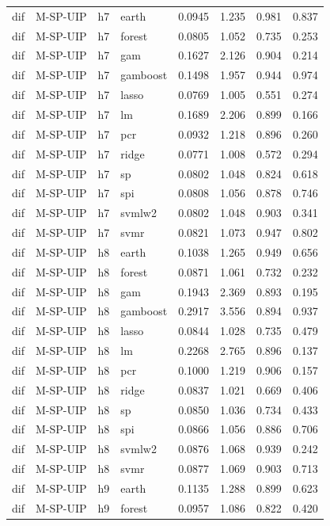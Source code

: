 \begin{ThreePartTable}
\begin{longtable}[t]{llclcccc}
dif & M-SP-UIP & h7 & earth & 0.0945 & 1.235 & 0.981 & 0.837\\
dif & M-SP-UIP & h7 & forest & 0.0805 & 1.052 & 0.735 & 0.253\\
dif & M-SP-UIP & h7 & gam & 0.1627 & 2.126 & 0.904 & 0.214\\
dif & M-SP-UIP & h7 & gamboost & 0.1498 & 1.957 & 0.944 & 0.974\\
dif & M-SP-UIP & h7 & lasso & 0.0769 & 1.005 & 0.551 & 0.274\\
dif & M-SP-UIP & h7 & lm & 0.1689 & 2.206 & 0.899 & 0.166\\
dif & M-SP-UIP & h7 & pcr & 0.0932 & 1.218 & 0.896 & 0.260\\
dif & M-SP-UIP & h7 & ridge & 0.0771 & 1.008 & 0.572 & 0.294\\
dif & M-SP-UIP & h7 & sp & 0.0802 & 1.048 & 0.824 & 0.618\\
dif & M-SP-UIP & h7 & spi & 0.0808 & 1.056 & 0.878 & 0.746\\
dif & M-SP-UIP & h7 & svmlw2 & 0.0802 & 1.048 & 0.903 & 0.341\\
dif & M-SP-UIP & h7 & svmr & 0.0821 & 1.073 & 0.947 & 0.802\\
\addlinespace
dif & M-SP-UIP & h8 & earth & 0.1038 & 1.265 & 0.949 & 0.656\\
dif & M-SP-UIP & h8 & forest & 0.0871 & 1.061 & 0.732 & 0.232\\
dif & M-SP-UIP & h8 & gam & 0.1943 & 2.369 & 0.893 & 0.195\\
dif & M-SP-UIP & h8 & gamboost & 0.2917 & 3.556 & 0.894 & 0.937\\
dif & M-SP-UIP & h8 & lasso & 0.0844 & 1.028 & 0.735 & 0.479\\
dif & M-SP-UIP & h8 & lm & 0.2268 & 2.765 & 0.896 & 0.137\\
dif & M-SP-UIP & h8 & pcr & 0.1000 & 1.219 & 0.906 & 0.157\\
dif & M-SP-UIP & h8 & ridge & 0.0837 & 1.021 & 0.669 & 0.406\\
dif & M-SP-UIP & h8 & sp & 0.0850 & 1.036 & 0.734 & 0.433\\
dif & M-SP-UIP & h8 & spi & 0.0866 & 1.056 & 0.886 & 0.706\\
dif & M-SP-UIP & h8 & svmlw2 & 0.0876 & 1.068 & 0.939 & 0.242\\
dif & M-SP-UIP & h8 & svmr & 0.0877 & 1.069 & 0.903 & 0.713\\
\addlinespace
dif & M-SP-UIP & h9 & earth & 0.1135 & 1.288 & 0.899 & 0.623\\
dif & M-SP-UIP & h9 & forest & 0.0957 & 1.086 & 0.822 & 0.420\\

\end{longtable}
\end{ThreePartTable}
